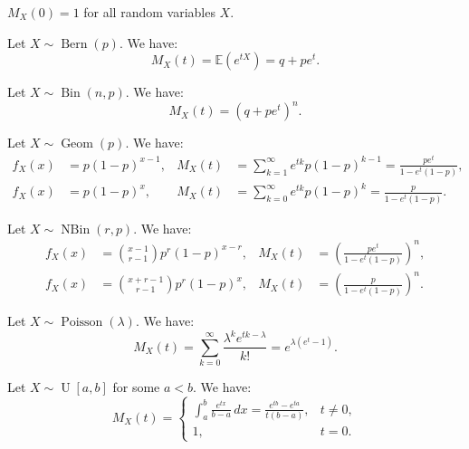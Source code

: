 \documentclass{huhtakm-template-book-v2}
\newcommand{\expect}{\mathbb{E}}
\DeclareMathOperator{\Bern}{Bern}
\DeclareMathOperator{\Bin}{Bin}
\DeclareMathOperator{\NBin}{NBin}
\DeclareMathOperator{\Geom}{Geom}
\DeclareMathOperator{\Poisson}{Poisson}
\DeclareMathOperator{\U}{U}
\begin{document}
    \begin{rem}
        $M_{X}(0) = 1$ for all random variables $X$.
    \end{rem}
    \begin{eg}
        Let $X \sim \Bern(p)$. We have:
        \begin{equation*}
            M_{X}(t) = \expect(e^{tX}) = q+pe^{t}.
        \end{equation*}
    \end{eg}
    \begin{eg}
        Let $X \sim \Bin(n,p)$. We have:
        \begin{equation*}
            M_{X}(t) = (q+pe^{t})^{n}.
        \end{equation*}
    \end{eg}
    \begin{eg}
        Let $X \sim \Geom(p)$. We have:
        \begin{align*}
            f_{X}(x) &= p(1-p)^{x-1}, & M_{X}(t) &= \sum_{k = 1}^{\infty}e^{tk}p(1-p)^{k-1} = \frac{pe^{t}}{1-e^{t}(1-p)},\\
            f_{X}(x) &= p(1-p)^{x}, & M_{X}(t) &= \sum_{k = 0}^{\infty}e^{tk}p(1-p)^{k} = \frac{p}{1-e^{t}(1-p)}.
        \end{align*}
    \end{eg}
    \begin{eg}
        Let $X \sim \NBin(r,p)$. We have:
        \begin{align*}
            f_{X}(x) &= \binom{x-1}{r-1}p^{r}(1-p)^{x-r}, & M_{X}(t) &= \left(\frac{pe^{t}}{1-e^{t}(1-p)}\right)^{n},\\
            f_{X}(x) &= \binom{x+r-1}{r-1}p^{r}(1-p)^{x}, & M_{X}(t) &= \left(\frac{p}{1-e^{t}(1-p)}\right)^{n}.
        \end{align*}
    \end{eg}
    \begin{eg}
        Let $X \sim \Poisson(\lambda)$. We have:
        \begin{equation*}
            M_{X}(t) = \sum_{k = 0}^{\infty}\frac{\lambda^{k}e^{tk-\lambda}}{k!} = e^{\lambda(e^{t}-1)}.
        \end{equation*}
    \end{eg}
    \begin{eg}
        Let $X \sim \U[a, b]$ for some $a < b$. We have:
        \begin{equation*}
            M_{X}(t) = \begin{cases}
                \int_{a}^{b}\frac{e^{tx}}{b-a}\,dx = \frac{e^{tb}-e^{ta}}{t(b-a)}, &t \neq 0,\\
                1, &t = 0.
            \end{cases}
        \end{equation*}
    \end{eg}
\end{document}
